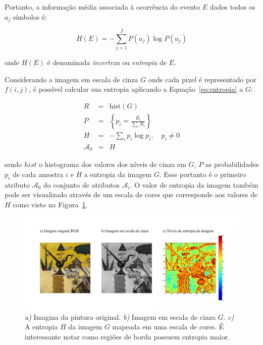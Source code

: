 Portanto, a informação média associada à ocorrência do evento $E$
dados todos os $a_j$ símbolos é:

\begin{equation}
  H(E) =  -\sum_{j=1}^J P(a_j) \log P(a_j)
  \label{eq:entropia}
\end{equation} 

\noindent onde $H(E)$ é denominada \emph{incerteza} ou \emph{entropia} de $E$.

Considerando a imagem em escala de cinza $G$ onde cada pixel é
representado por $f(i,j)$, é possível calcular sua entropia aplicando
a Equação~\ref{eq:entropia} a $G$:

\begin{eqnarray}
  R & = & \text{hist}(G) \\
  P & = & \left\{ p_i = \frac{R_i}{\sum_{i} R_i} \right\}\\
  H & = & -\sum_i p_i \log p_i, \,\,\,\,\,\, p_i \neq 0 \\
  \mathcal{A}_0 & = & H
\end{eqnarray}

\noindent sendo $hist$ o histograma dos valores dos níveis de cinza em
$G$, $P$ as probabilidades $p_i$ de cada amostra $i$ e $H$ a entropia
da imagem $G$. Esse portanto é o primeiro atributo $\mathcal{A}_0$ do
conjunto de atributos $\mathcal{A}_i$. O valor de entropia da imagem também pode ser visualizado através de um escala de cores que corresponde aos valores de $H$ como visto na Figura~\ref{fig:entrop}.

\begin{figure}[h!]
\begin{center}
        \includegraphics[scale=1]{figs/entrop}
      \caption{\textit{a)} Imagina da pintura original. \textit{b)}
        Imagem em escala de cinza $G$. \textit{c)} A entropia $H$ da
        imagem $G$ mapeada em uma escala de cores. É interessante
        notar como regiões de borda possuem entropia maior.}
        \label{fig:entrop}
\end{center}
\end{figure}

